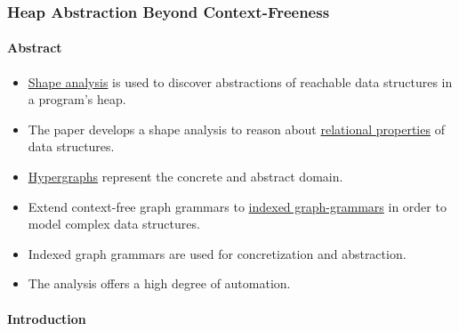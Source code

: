 \documentclass[a4paper,12pt]{article}
\begin{document}

\subsubsection{Heap Abstraction Beyond Context-Freeness}

\paragraph{Abstract}

\begin{itemize}
	\item \ul{Shape analysis} is used to discover abstractions of reachable data structures in a program's heap.
	\item The paper develops a shape analysis to reason about \ul{relational properties} of data structures.
	\item \ul{Hypergraphs} represent the concrete and abstract domain.
	\item Extend context-free graph grammars to \ul{indexed graph-grammars} in order to model complex data structures.
	\item Indexed graph grammars are used for concretization and abstraction.
	\item The analysis offers a high degree of automation.
\end{itemize}

\paragraph{Introduction}
\end{document}
